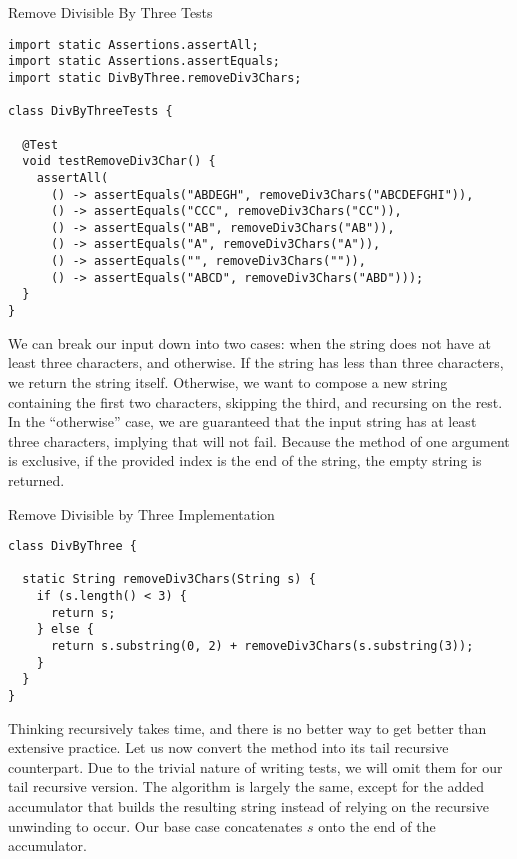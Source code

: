 \begin{cl}[]{Remove Divisible By Three Tests}
\begin{lstlisting}[language=MyJava]
import static Assertions.assertAll;
import static Assertions.assertEquals;
import static DivByThree.removeDiv3Chars;

class DivByThreeTests {

  @Test
  void testRemoveDiv3Char() {
    assertAll(
      () -> assertEquals("ABDEGH", removeDiv3Chars("ABCDEFGHI")),
      () -> assertEquals("CCC", removeDiv3Chars("CC")),
      () -> assertEquals("AB", removeDiv3Chars("AB")),
      () -> assertEquals("A", removeDiv3Chars("A")),
      () -> assertEquals("", removeDiv3Chars("")),
      () -> assertEquals("ABCD", removeDiv3Chars("ABD")));
  }
}
\end{lstlisting}
\end{cl}

We can break our input down into two cases: when the string does not have at least three characters, and otherwise. If the string has less than three characters, we return the string itself. Otherwise, we want to compose a new string containing the first two characters, skipping the third, and recursing on the rest. In the ``otherwise'' case, we are guaranteed that the input string has at least three characters, implying that  will not fail. Because the  method of one argument is exclusive, if the provided index is the end of the string, the empty string is returned.

\begin{cl}[]{Remove Divisible by Three Implementation}
\begin{lstlisting}[language=MyJava]
class DivByThree {

  static String removeDiv3Chars(String s) {
    if (s.length() < 3) {
      return s;
    } else {
      return s.substring(0, 2) + removeDiv3Chars(s.substring(3));
    }
  }
}
\end{lstlisting}
\end{cl}
Thinking recursively takes time, and there is no better way to get better than extensive practice. Let us now convert the method into its tail recursive counterpart. Due to the trivial nature of writing tests, we will omit them for our tail recursive version. The algorithm is largely the same, except for the added accumulator that builds the resulting string instead of relying on the recursive unwinding to occur. Our base case concatenates $s$ onto the end of the accumulator.

